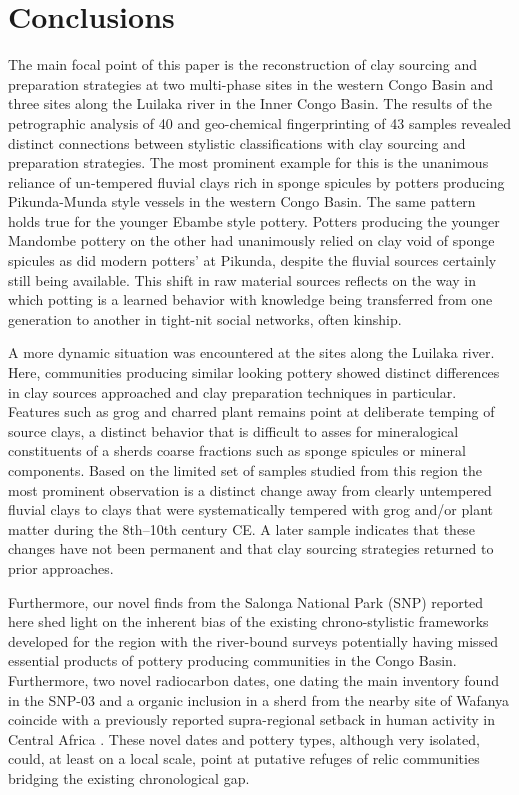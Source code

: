 \documentclass[preprint,10pt,oneside,onecolumn,authoryear]{elsarticle}
\begin{document}
\section{Conclusions}

The main focal point of this paper is the reconstruction of clay sourcing and preparation strategies at two multi-phase sites in the western Congo Basin and three sites along the Luilaka river in the Inner Congo Basin. The results of the petrographic analysis of 40 and geo-chemical fingerprinting of 43 samples revealed distinct connections between stylistic classifications \cite{Wotzka.1995,Seidensticker.2021e} with clay sourcing and preparation strategies. The most prominent example for this is the unanimous reliance of un-tempered fluvial clays rich in sponge spicules by potters producing Pikunda-Munda style vessels in the western Congo Basin. The same pattern holds true for the younger Ebambe style pottery. Potters producing the younger Mandombe pottery on the other had unanimously relied on clay void of sponge spicules as did modern potters' at Pikunda, despite the fluvial sources certainly still being available. This shift in raw material sources reflects on the way in which potting is a learned behavior with knowledge being transferred from one generation to another in tight-nit social networks, often kinship.

A more dynamic situation was encountered at the sites along the Luilaka river. Here, communities producing similar looking pottery showed distinct differences in clay sources approached and clay preparation techniques in particular. Features such as grog and charred plant remains point at deliberate temping of source clays, a distinct behavior that is difficult to asses for mineralogical constituents of a sherds coarse fractions such as sponge spicules or mineral components. Based on the limited set of samples studied from this region the most prominent observation is a distinct change away from clearly untempered fluvial clays to clays that were systematically tempered with grog and/or plant matter during the 8th--10th century CE. A later sample indicates that these changes have not been permanent and that clay sourcing strategies returned to prior approaches.

Furthermore, our novel finds from the Salonga National Park (SNP) reported here shed light on the inherent bias of the existing chrono-stylistic frameworks developed for the region \citep{Wotzka.1995,Seidensticker.2021e} with the river-bound surveys potentially having missed essential products of pottery producing communities in the Congo Basin. Furthermore, two novel radiocarbon dates, one dating the main inventory found in the SNP-03 and a organic inclusion in a sherd from the nearby site of Wafanya coincide with a previously reported supra-regional setback in human activity in Central Africa \citep{Seidensticker.2021e}. These novel dates and pottery types, although very isolated, could, at least on a local scale, point at putative refuges of relic communities bridging the existing chronological gap.
\end{document}
